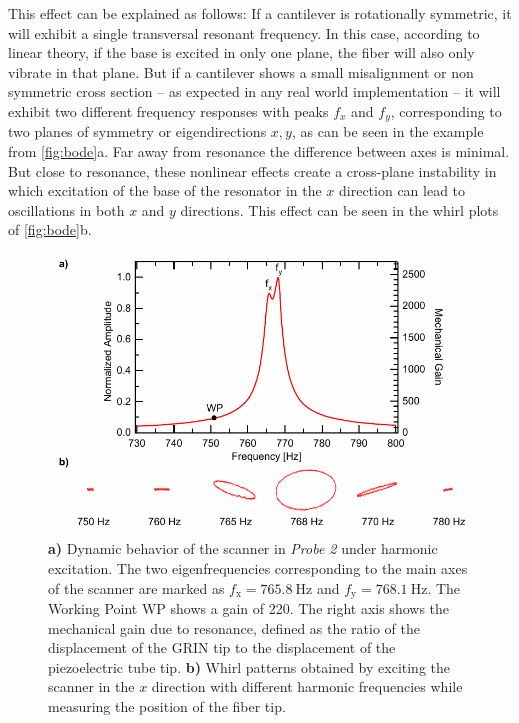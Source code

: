 \documentclass[10pt]{iopart}
\begin{document}
This effect can be explained as follows: If a cantilever is rotationally symmetric, it will exhibit a single transversal resonant frequency. In this case, according to linear theory, if the base is excited in only one plane, the fiber will also only vibrate in that plane. But if a cantilever shows a small misalignment or non symmetric cross section -- as expected in any real world implementation -- it will exhibit two different frequency responses with peaks $f_x$ and $f_y$, corresponding to two planes of symmetry or eigendirections $x,y$, as can be seen in the example from \autoref{fig:bode}a. Far away from resonance the difference between axes is minimal. But close to resonance, these nonlinear effects create a cross-plane instability in which excitation of the base of the resonator in the $x$ direction can lead to oscillations in both $x$ and $y$ directions. This effect can be seen in the whirl plots of \autoref{fig:bode}b. 

\begin{figure}[h!]\centering \includegraphics[width=\columnwidth]{figures/bodeWhirl.pdf}
      \caption{\textbf{a)} Dynamic behavior of the scanner in \textit{Probe 2} under harmonic excitation. The two eigenfrequencies corresponding to the main axes of the scanner are marked as $f_\mathrm{x} = \SI{765.8}{\hertz}$ and $f_\mathrm{y} = \SI{768.1}{\hertz}$.
      The Working Point WP shows a gain of 220. 
      The right axis shows the mechanical gain due to resonance, defined as the ratio of the displacement of the GRIN tip to the displacement of the piezoelectric tube tip.
      \textbf{b)} Whirl patterns obtained by exciting the scanner in the $x$ direction with different harmonic frequencies while measuring the position of the fiber tip. }
      \label{fig:bode}
\end{figure}
\end{document}
